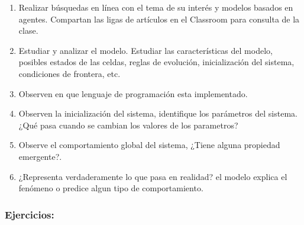 \documentclass[12pt]{article}
\begin{document}
\begin{enumerate}
    \item Realizar búsquedas en línea con el tema de su interés y modelos basados en agentes. Compartan las ligas de artículos en el Classroom para consulta de la clase.\\
    \item Estudiar y analizar el modelo. Estudiar las características del modelo, posibles estados de las celdas, reglas de evolución, inicialización del sistema, condiciones de frontera, etc.\\
    \item Observen en que lenguaje de programación esta implementado.\\
    \item Observen la inicialización del sistema, identifique los parámetros del sistema. ¿Qué pasa cuando se cambian los valores de los parametros?\\
    \item Observe el comportamiento global del sistema, ¿Tiene alguna propiedad emergente?.\\
    \item ¿Representa verdaderamente lo que pasa en realidad? el modelo explica el fenómeno o predice algun tipo de comportamiento. 
\end{enumerate}



{\color{blue} \subsubsection*{Ejercicios:}}
\end{document}

